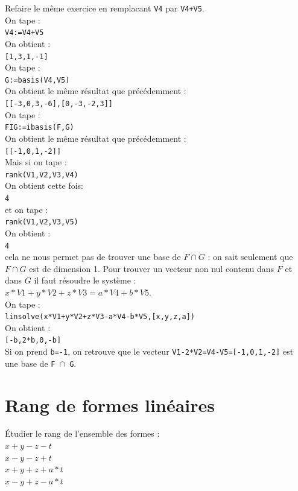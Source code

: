 \documentclass[a4paper,11pt]{book}
\begin{document}
Refaire le m\^eme exercice en remplacant {\tt V4} par {\tt V4+V5}.\\
On tape :\\
{\tt V4:=V4+V5}\\
On obtient :\\
{\tt [1,3,1,-1]}\\
On tape :\\
{\tt G:=basis(V4,V5)}\\
On obtient le m\^eme r\'esultat que pr\'ec\'edemment :\\
{\tt [[-3,0,3,-6],[0,-3,-2,3]]}\\
On tape :\\
{\tt FIG:=ibasis(F,G)}\\
On obtient  le m\^eme r\'esultat que pr\'ec\'edemment :\\
{\tt [[-1,0,1,-2]]}\\
Mais si on tape :\\
{\tt rank(V1,V2,V3,V4)}\\
On obtient cette fois:\\
{\tt 4}\\
et on tape :\\
{\tt rank(V1,V2,V3,V5)}\\
On obtient :\\
{\tt 4}\\
cela ne nous permet pas de trouver une base de $F \cap G$ : on sait 
seulement que $F \cap G$ est de dimension 1. Pour trouver un vecteur non nul
contenu dans $F$ et dans $G$ il faut r\'esoudre le syst\`eme :\\
$x*V1+y*V2+z*V3=a*V4+b*V5$.\\
On tape :\\
{\tt linsolve(x*V1+y*V2+z*V3-a*V4-b*V5,[x,y,z,a])}\\
On obtient :\\
{\tt [-b,2*b,0,-b]}\\
Si on prend {\tt b=-1}, on retrouve que le vecteur 
{\tt V1-2*V2=V4-V5=[-1,0,1,-2]}
est une base de {\tt F $\cap$ G}.

\section{Rang de formes lin\'eaires}
\'Etudier le rang de l'ensemble des formes :\\
$x+y-z-t$\\
$x-y-z+t$\\
$x+y+z+a*t$\\
$x-y+z-a*t$\\
\end{document}
